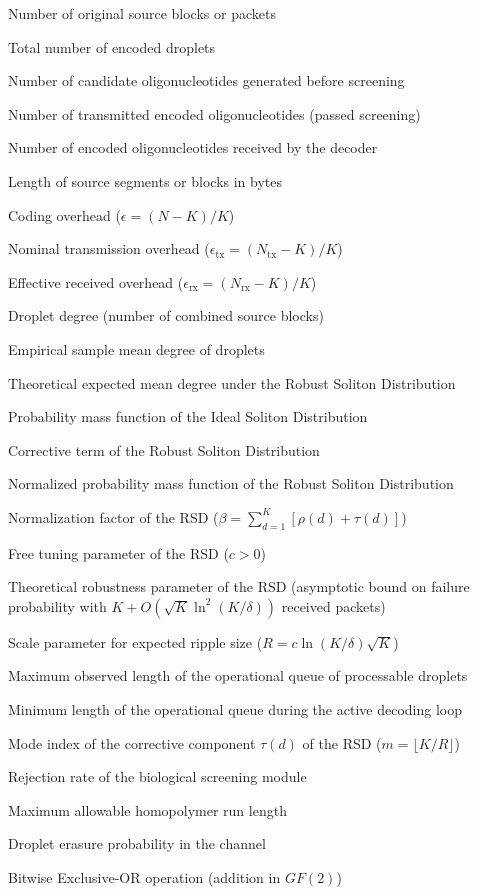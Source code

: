 \begin{simbolos}
  \item[$K$] Number of original source blocks or packets
  \item[$N$] Total number of encoded droplets
  \item[$N_{\text{cand}}$] Number of candidate oligonucleotides generated before screening
  \item[$N_{\text{tx}}$] Number of transmitted encoded oligonucleotides (passed screening)
  \item[$N_{\text{rx}}$] Number of encoded oligonucleotides received by the decoder
  \item[$L$] Length of source segments or blocks in bytes
  \item[$\epsilon$] Coding overhead ($\epsilon = (N - K)/K$)
  \item[$\epsilon_{\text{tx}}$] Nominal transmission overhead ($\epsilon_{\text{tx}} = (N_{\text{tx}} - K)/K$)
  \item[$\epsilon_{\text{rx}}$] Effective received overhead ($\epsilon_{\text{rx}} = (N_{\text{rx}} - K)/K$)
  \item[$d$] Droplet degree (number of combined source blocks)
  \item[{$\bar{d}_{\text{emp}}$}] Empirical sample mean degree of droplets
  \item[{$\mathbb{E}_\mu[D]$}] Theoretical expected mean degree under the Robust Soliton Distribution
  \item[$\rho(d)$] Probability mass function of the Ideal Soliton Distribution
  \item[$\tau(d)$] Corrective term of the Robust Soliton Distribution
  \item[$\mu(d)$] Normalized probability mass function of the Robust Soliton Distribution
  \item[$\beta$] Normalization factor of the RSD ($\beta = \sum_{d=1}^K [\rho(d) + \tau(d)]$)
  \item[$c$] Free tuning parameter of the RSD ($c > 0$)
  \item[$\delta$] Theoretical robustness parameter of the RSD (asymptotic bound on failure probability with $K + O(\sqrt{K}\ln^2(K/\delta))$ received packets)
  \item[$R$] Scale parameter for expected ripple size ($R = c \ln(K/\delta)\sqrt{K}$)
  \item[$Q_{\max}$] Maximum observed length of the operational queue of processable droplets
  \item[$Q_{\min}$] Minimum length of the operational queue during the active decoding loop
  \item[$m$] Mode index of the corrective component $\tau(d)$ of the RSD ($m = \lfloor K/R \rfloor$)
  \item[$R_{\text{screen}}$] Rejection rate of the biological screening module
  \item[$H_{\max}$] Maximum allowable homopolymer run length
  \item[$p_{\text{loss}}$] Droplet erasure probability in the channel
  \item[$\oplus$] Bitwise Exclusive-OR operation (addition in $GF(2)$)
\end{simbolos}
